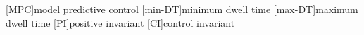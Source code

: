 [MPC]{model predictive control}
[min-DT]{minimum dwell time}
[max-DT]{maximum dwell time}
[PI]{positive invariant}
[CI]{control invariant}
